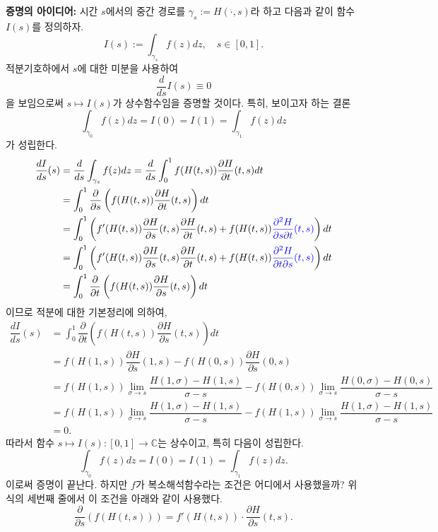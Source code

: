 {\bf 증명의 아이디어:}
시간 $s$에서의 중간 경로를 $\gamma_s := H(\cdot, s)$라 하고
다음과 같이 함수 $I(s)$를 정의하자.
\[
I(s) := \int_{\gamma_s} f(z)dz, \quad s\in [0,1].
\]
적분기호하에서 $s$에 대한 미분을 사용하여
\[
\dfrac d{ds} I(s) \equiv 0
\]
을 보임으로써 $s\mapsto I(s)$가 상수함수임을 증명할 것이다.
특히, 보이고자 하는 결론
\[
\int_{\gamma_0} f(z)dz = I(0) = I(1) = \int_{\gamma_1} f(z)dz
\]
가 성립한다.
\begin{align*}
\dfrac{dI}{ds}(s)
&= \dfrac d{ds} \int_{\gamma_s} f(z)dz 
= \dfrac d{ds} \int_0^1 f(H(t,s))\dfrac{\partial H}{\partial t}(t,s)dt \\
&= \int_0^1 \dfrac{\partial}{\partial s} \left( f(H(t,s))\dfrac{\partial H}{\partial t}(t,s) \right) dt \\
&= \int_0^1 \left(  f'(H(t,s))\dfrac{\partial H}{\partial s}(t,s)\dfrac{\partial H}{\partial t}(t,s)
+ f(H(t,s)) \textcolor{blue}{\dfrac{\partial^2H}{\partial s\partial t}(t,s)} \right) dt \\
&= \int_0^1 \left(  f'(H(t,s))\dfrac{\partial H}{\partial s}(t,s)\dfrac{\partial H}{\partial t}(t,s)
+ f(H(t,s)) \textcolor{blue}{\dfrac{\partial^2H}{\partial t\partial s}(t,s)} \right) dt \\
&= \int_0^1 \dfrac \partial{\partial t} \left( f(H(t,s)) \dfrac{\partial H}{\partial s}(t,s) \right) dt
\end{align*}
이므로 적분에 대한 기본정리에 의하여,
\begin{align*}
\dfrac{dI}{ds}(s)
&= \int_0^1 \dfrac \partial{\partial t} \left( f(H(t,s)) \dfrac{\partial H}{\partial s}(t,s) \right) dt \\
&= f(H(1,s))  \dfrac{\partial H}{\partial s}(1,s) - f(H(0,s)) \dfrac{\partial H}{\partial s}(0,s) \\
&= f(H(1,s)) \lim_{\sigma\to s} \dfrac{H(1,\sigma) - H(1,s)}{\sigma - s}
- f(H(0,s)) \lim_{\sigma\to s} \dfrac{H(0,\sigma) - H(0,s)}{\sigma - s} \\
&= f(H(1,s)) \lim_{\sigma\to s} \dfrac{H(1,\sigma) - H(1,s)}{\sigma - s}
- f(H(1,s)) \lim_{\sigma\to s} \dfrac{H(1,\sigma) - H(1,s)}{\sigma - s} \\
&=0.
\end{align*}
따라서 함수 $s\mapsto I(s): [0,1] \to \mathbb C$는 상수이고, 특히
다음이 성립한다.
\[
\int_{\gamma_0} f(z)dz = I(0) = I(1) = \int_{\gamma_1} f(z)dz.
\]
이로써 증명이 끝난다. 하지만 $f$가 복소해석함수라는 조건은 어디에서 사용했을까?
위 식의 세번째 줄에서 이 조건을 아래와 같이 사용했다.
\[
\dfrac\partial{\partial s}(f(H(t,s))) = f'(H(t,s))\cdot \dfrac{\partial H}{\partial s}(t,s).
\]
